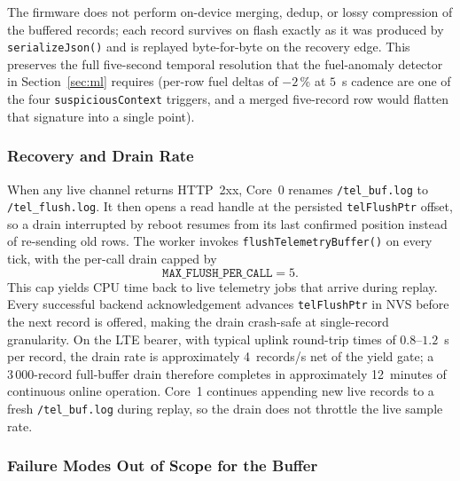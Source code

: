 The firmware does not perform on-device merging, dedup, or lossy compression of the buffered records; each record survives on flash exactly as it was produced by \texttt{serializeJson()} and is replayed byte-for-byte on the recovery edge. This preserves the full five-second temporal resolution that the fuel-anomaly detector in Section~\ref{sec:ml} requires (per-row fuel deltas of $-2$\,\% at $5$~s cadence are one of the four \texttt{suspiciousContext} triggers, and a merged five-record row would flatten that signature into a single point).

\subsubsection{Recovery and Drain Rate}
\label{sec:offline_recovery_drain}

When any live channel returns HTTP~2xx, Core~0 renames \texttt{/tel\_buf.log} to \texttt{/tel\_flush.log}. It then opens a read handle at the persisted \texttt{telFlushPtr} offset, so a drain interrupted by reboot resumes from its last confirmed position instead of re-sending old rows. The worker invokes \texttt{flushTelemetryBuffer()} on every tick, with the per-call drain capped by
\[
\texttt{MAX\_FLUSH\_PER\_CALL} = 5.
\]
This cap yields CPU time back to live telemetry jobs that arrive during replay. Every successful backend acknowledgement advances \texttt{telFlushPtr} in NVS before the next record is offered, making the drain crash-safe at single-record granularity. On the LTE bearer, with typical uplink round-trip times of $0.8$--$1.2$~s per record, the drain rate is approximately 4~records/s net of the yield gate; a $3\,000$-record full-buffer drain therefore completes in approximately 12~minutes of continuous online operation. Core~1 continues appending new live records to a fresh \texttt{/tel\_buf.log} during replay, so the drain does not throttle the live sample rate.

\subsubsection{Failure Modes Out of Scope for the Buffer}
\label{sec:offline_out_of_scope}

